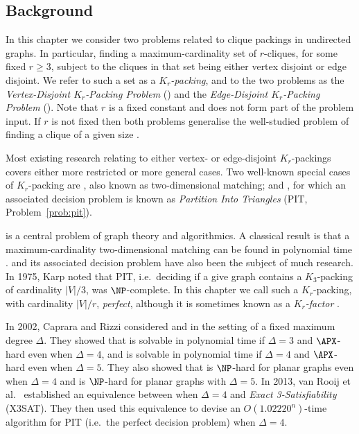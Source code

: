 \subsection{Background}
\label{sec:krpacking_background}

In this chapter we consider two problems related to clique packings in undirected graphs. In particular, finding a maximum-cardinality set of $r$-cliques, for some fixed $r \geq 3$, subject to the cliques in that set being either vertex disjoint or edge disjoint. We refer to such a set as a \emph{$K_r$-packing}, and to the two problems as the \emph{Vertex-Disjoint $K_r$-Packing Problem} (\vdkr) and the \emph{Edge-Disjoint $K_r$-Packing Problem} (\edkr). Note that $r$ is a fixed constant and does not form part of the problem input. If $r$ is not fixed then both problems generalise the well-studied problem of finding a clique of a given size \cite{GJ79}.

Most existing research relating to either vertex- or edge-disjoint $K_r$-packings covers either more restricted or more general cases. Two well-known special cases of $K_r$-packing are \vdktwo, also known as two-dimensional matching; and \vdkthree, for which an associated decision problem is known as \emph{Partition Into Triangles} (PIT, Problem~\ref{prob:pit}). 

\vdktwo is a central problem of graph theory and algorithmics. A classical result is that a maximum-cardinality two-dimensional matching can be found in polynomial time \cite{Edm65, MV80}. \vdkthree and its associated decision problem have also been the subject of much research. In 1975, Karp \cite{Karp75} noted that PIT, i.e.\ deciding if a give graph contains a $K_3$-packing of cardinality $|V|/3$, was $\NP$-complete. In this chapter we call such a $K_r$-packing, with cardinality $|V|/r$, \emph{perfect}, although it is sometimes known as a \emph{$K_r$-factor} \cite{guruswami_k_2001}.

In 2002, Caprara and Rizzi \cite{caprara_packing_2002} considered \vdkthree and \edkthree in the setting of a fixed maximum degree $\Delta$. They showed that \vdkthree is solvable in polynomial time if $\Delta = 3$ and $\APX$-hard even when $\Delta = 4$, and \edkthree is solvable in polynomial time if $\Delta = 4$ and $\APX$-hard even when $\Delta = 5$. They also showed that \vdkthree is $\NP$-hard for planar graphs even when $\Delta = 4$ and \edkthree is $\NP$-hard for planar graphs with $\Delta = 5$. In 2013, van Rooij et al.\ \cite{van_rooij_partition_2013} established an equivalence between \vdkthree when $\Delta = 4$ and \emph{Exact 3-Satisfiability} (X3SAT). They then used this equivalence to devise an $O(1.02220^n)$-time algorithm for PIT (i.e.\ the perfect \vdkthree decision problem) when $\Delta = 4$.

